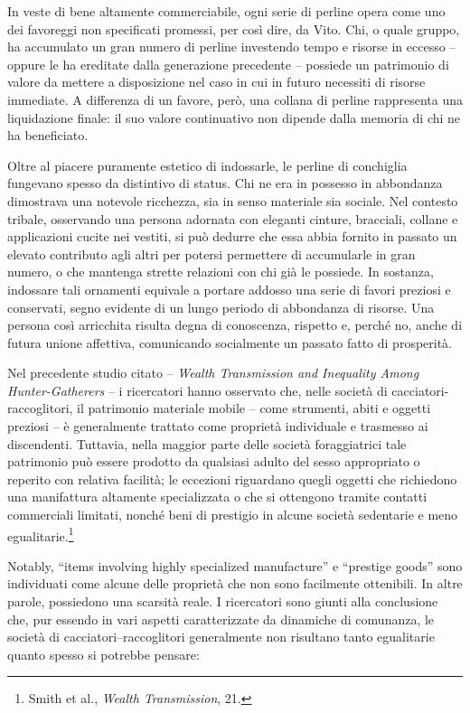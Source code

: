 \documentclass[
  a5paper,
  smalldemyvopaper,10pt,twoside,onecolumn,openright,extrafontsizes,hidelinks]{memoir}
\begin{document}
In veste di bene altamente commerciabile, ogni serie di perline opera
come uno dei favoreggi non specificati promessi, per così dire, da Vito.
Chi, o quale gruppo, ha accumulato un gran numero di perline investendo
tempo e risorse in eccesso -- oppure le ha ereditate dalla generazione
precedente -- possiede un patrimonio di valore da mettere a disposizione
nel caso in cui in futuro necessiti di risorse immediate. A differenza
di un favore, però, una collana di perline rappresenta una liquidazione
finale: il suo valore continuativo non dipende dalla memoria di chi ne
ha beneficiato.

Oltre al piacere puramente estetico di indossarle, le perline di
conchiglia fungevano spesso da distintivo di status. Chi ne era in
possesso in abbondanza dimostrava una notevole ricchezza, sia in senso
materiale sia sociale. Nel contesto tribale, osservando una persona
adornata con eleganti cinture, bracciali, collane e applicazioni cucite
nei vestiti, si può dedurre che essa abbia fornito in passato un elevato
contributo agli altri per potersi permettere di accumularle in gran
numero, o che mantenga strette relazioni con chi già le possiede. In
sostanza, indossare tali ornamenti equivale a portare addosso una serie
di favori preziosi e conservati, segno evidente di un lungo periodo di
abbondanza di risorse. Una persona così arricchita risulta degna di
conoscenza, rispetto e, perché no, anche di futura unione affettiva,
comunicando socialmente un passato fatto di prosperità.

Nel precedente studio citato -- \emph{Wealth Transmission and Inequality
Among Hunter-Gatherers} -- i ricercatori hanno osservato che, nelle
società di cacciatori-raccoglitori, il patrimonio materiale mobile --
come strumenti, abiti e oggetti preziosi -- è generalmente trattato come
proprietà individuale e trasmesso ai discendenti. Tuttavia, nella
maggior parte delle società foraggiatrici tale patrimonio può essere
prodotto da qualsiasi adulto del sesso appropriato o reperito con
relativa facilità; le eccezioni riguardano quegli oggetti che richiedono
una manifattura altamente specializzata o che si ottengono tramite
contatti commerciali limitati, nonché beni di prestigio in alcune
società sedentarie e meno egualitarie.\footnote{Smith et al.,
  \emph{Wealth Transmission}, 21.}

Notably, ``items involving highly specialized manufacture'' e ``prestige
goods'' sono individuati come alcune delle proprietà che non sono
facilmente ottenibili. In altre parole, possiedono una scarsità reale. I
ricercatori sono giunti alla conclusione che, pur essendo in vari
aspetti caratterizzate da dinamiche di comunanza, le società di
cacciatori--raccoglitori generalmente non risultano tanto egualitarie
quanto spesso si potrebbe pensare:
\end{document}
